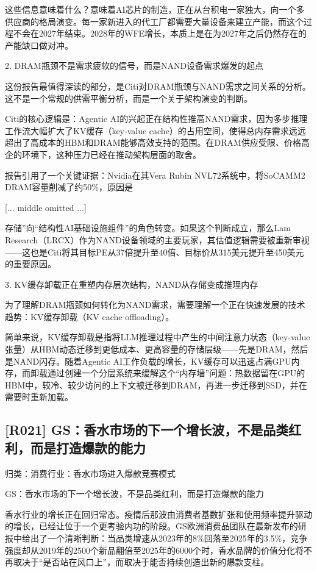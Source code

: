 \documentclass[11pt]{ctexart}
\begin{document}
这些信息意味着什么？意味着AI芯片的制造，正在从台积电一家独大，向一个多供应商的格局演变。每一家新进入的代工厂都需要大量设备来建立产能，而这个过程不会在2027年结束。2028年的WFE增长，本质上是在为2027年之后仍然存在的产能缺口做对冲。

2. DRAM瓶颈不是需求疲软的信号，而是NAND设备需求爆发的起点

这份报告最值得深读的部分，是Citi对DRAM瓶颈与NAND需求之间关系的分析。这不是一个常规的供需平衡分析，而是一个关于架构演变的判断。

Citi的核心逻辑是：Agentic AI的兴起正在结构性推高NAND需求，因为多步推理工作流大幅扩大了KV缓存（key-value cache）的占用空间，使得总内存需求远远超出了高成本的HBM和DRAM能够高效支持的范围。在DRAM供应受限、价格高企的环境下，这种压力已经在推动架构层面的取舍。

报告引用了一个关键证据：Nvidia在其Vera Rubin NVL72系统中，将SoCAMM2 DRAM容量削减了约50\%，原因是

[... middle omitted ...]

存储”向“结构性AI基础设施组件”的角色转变。如果这个判断成立，那么Lam Research（LRCX）作为NAND设备领域的主要玩家，其估值逻辑需要被重新审视——这也是Citi将其目标PE从37倍提升至40倍、目标价从315美元提升至450美元的重要原因。

3. KV缓存卸载正在重塑内存层次结构，NAND从存储变成推理内存

为了理解DRAM瓶颈如何转化为NAND需求，需要理解一个正在快速发展的技术趋势：KV缓存卸载（KV cache offloading）。

简单来说，KV缓存卸载是指将LLM推理过程中产生的中间注意力状态（key-value张量）从HBM动态迁移到更低成本、更高容量的存储层级——先是DRAM，然后是NAND闪存。随着Agentic AI工作负载的增长，KV缓存可以迅速占满GPU内存，而卸载通过创建一个分层系统来缓解这个“内存墙”问题：热数据留在GPU的HBM中，较冷、较少访问的上下文被迁移到DRAM，再进一步迁移到SSD，并在需要时重新加载。

\subsection{[R021] GS：香水市场的下一个增长波，不是品类红利，而是打造爆款的能力}
{\small\color{refgray}归类：消费行业：香水市场进入爆款竞赛模式}

GS：香水市场的下一个增长波，不是品类红利，而是打造爆款的能力

香水行业的增长正在回归常态。疫情后那波由消费者基数扩张和使用频率提升驱动的增长，已经让位于一个更考验内功的阶段。GS欧洲消费品团队在最新发布的研报中给出了一个清晰判断：当品类增速从2023年的8\%回落至2025年的3.5\%，竞争强度却从2019年的2500个新品翻倍至2025年的6000个时，香水品牌的价值分化将不再取决于“是否站在风口上”，而取决于能否持续创造出新的爆款支柱。
\end{document}
